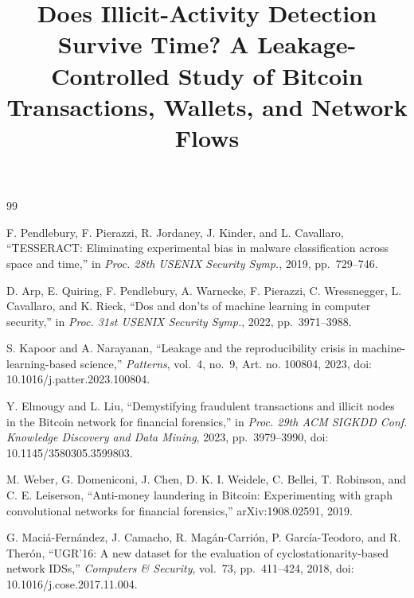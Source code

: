 \documentclass[conference]{IEEEtran}
\begin{document}
\title{Does Illicit-Activity Detection Survive Time? A Leakage-Controlled Study of Bitcoin Transactions, Wallets, and Network Flows}

\author{
}

\maketitle










\begin{thebibliography}{99}

 F. Pendlebury, F. Pierazzi, R. Jordaney, J. Kinder, and L. Cavallaro, ``TESSERACT: Eliminating experimental bias in malware classification across space and time,'' in \emph{Proc. 28th USENIX Security Symp.}, 2019, pp.~729--746.

 D. Arp, E. Quiring, F. Pendlebury, A. Warnecke, F. Pierazzi, C. Wressnegger, L. Cavallaro, and K. Rieck, ``Dos and don'ts of machine learning in computer security,'' in \emph{Proc. 31st USENIX Security Symp.}, 2022, pp.~3971--3988.

 S. Kapoor and A. Narayanan, ``Leakage and the reproducibility crisis in machine-learning-based science,'' \emph{Patterns}, vol.~4, no.~9, Art. no. 100804, 2023, doi: 10.1016/j.patter.2023.100804.

 Y. Elmougy and L. Liu, ``Demystifying fraudulent transactions and illicit nodes in the Bitcoin network for financial forensics,'' in \emph{Proc. 29th ACM SIGKDD Conf. Knowledge Discovery and Data Mining}, 2023, pp.~3979--3990, doi: 10.1145/3580305.3599803.

 M. Weber, G. Domeniconi, J. Chen, D. K. I. Weidele, C. Bellei, T. Robinson, and C. E. Leiserson, ``Anti-money laundering in Bitcoin: Experimenting with graph convolutional networks for financial forensics,'' arXiv:1908.02591, 2019.

 G. Maci\'a-Fern\'andez, J. Camacho, R. Mag\'an-Carri\'on, P. Garc\'ia-Teodoro, and R. Ther\'on, ``UGR'16: A new dataset for the evaluation of cyclostationarity-based network IDSs,'' \emph{Computers \& Security}, vol.~73, pp.~411--424, 2018, doi: 10.1016/j.cose.2017.11.004.


\end{thebibliography}
\end{document}
